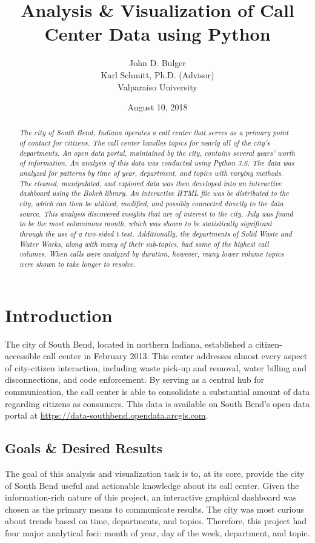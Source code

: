 \documentclass{article}
\title{Analysis \& Visualization of Call Center Data using Python}
\author{John D. Bulger
\\
Karl Schmitt, Ph.D. (Advisor)
\\
Valparaiso University\\
}
\date{August 10, 2018}
\begin{document}
\maketitle

\begin{abstract}
\textit{The city of South Bend, Indiana operates a call center that serves as a primary point of contact for citizens.  The call center handles topics for nearly all of the city's departments.  An open data portal, maintained by the city, contains several years' worth of information.  An analysis of this data was conducted using Python 3.6.  The data was 
analyzed for patterns by time of year, department, and topics with varying methods.  The cleaned, manipulated, and explored data was then developed into an 
interactive dashboard using the Bokeh library.  An interactive HTML file was be distributed to the city, which can then be utilized, modified, and possibly connected 
directly to the data source.  This analysis discovered insights that are of interest to the city.  July was found to be the most voluminous month, which was shown to be statistically significant through the use of a two-sided t-test.  Additionally, the departments of Solid Waste and Water Works, along with many of their sub-topics, had some of the highest call volumes.  When calls were analyzed by duration, however, many lower volume topics were shown to take longer to resolve.}
\end{abstract}

\section{Introduction}
The city of South Bend, located in northern Indiana, established a citizen-accessible call center in February 2013.  This center addresses almost every aspect of city-citizen interaction, including waste pick-up and removal, water billing and disconnections, 
and code enforcement.  By serving as a central hub for communication, the call center is able to consolidate a substantial amount of data regarding citizens as consumers.  This data is available on South Bend's open data portal at \href{https://data-southbend.opendata.arcgis.com}{https://data-southbend.opendata.arcgis.com}.

	\subsection{Goals \& Desired Results}

The goal of this analysis and visualization task is to, at its core, provide the city of South Bend useful and actionable knowledge about its call center.  Given the information-rich nature of this project, an interactive graphical dashboard was chosen as the primary means to communicate results.  The city was most curious about trends based on time, departments, and topics.  Therefore, this project had four major analytical foci:  month of year, day of the week, department, and topic.
\end{document}
